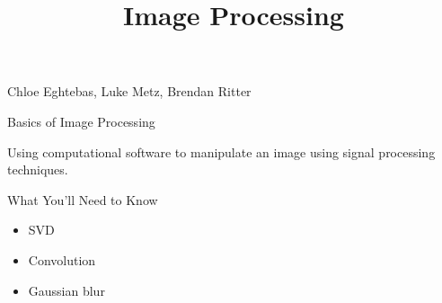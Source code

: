 \documentclass{beamer}
\begin{document}
\begin{frame}{}

\title{\textbf{Image Processing}}
\maketitle

Chloe Eghtebas, Luke Metz, Brendan Ritter

\end{frame}


\begin{frame}{Basics of Image Processing}

Using computational software to manipulate an image using signal processing techniques.

\end{frame}



\begin{frame}{What You'll Need to Know}

\begin{itemize}
	\item SVD
	\item Convolution
	\item Gaussian blur
\end{itemize}
\end{frame}
\end{document}
